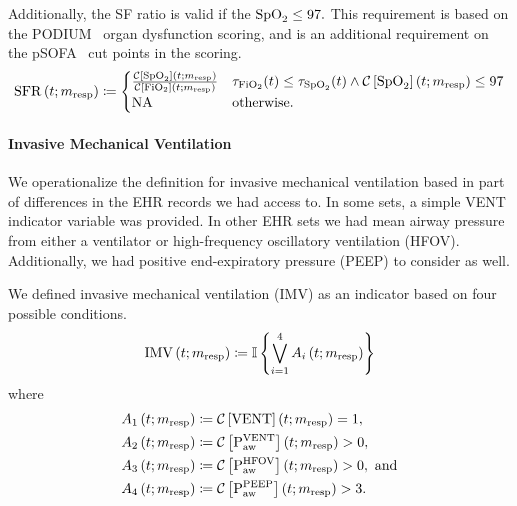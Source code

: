 \documentclass[letterpaper,10pt]{article}
\begin{document}
Additionally, the SF ratio is valid if the $\mathrm{SpO}_{2} \leq 97.$ This requirement is
based on the PODIUM~\citep{Bembea2022,Yehya2022} organ
dysfunction scoring, and is an additional requirement on the
pSOFA~\citep{Matics2017} cut points in
the scoring.
\begin{equation}
  \label{eq:sfr}
  \mathrm{SFR}\left(t; m_{\mathrm{resp}}\right) \coloneqq
  \begin{cases}
    \frac{\mathcal{C}\left[\mathrm{SpO}_{2}\right]\left(t;m_{\mathrm{resp}}\right)}{\mathcal{C}\left[\mathrm{FiO}_{2}\right]\left(t;m_{\mathrm{resp}}\right)} &
    \tau_{\mathrm{FiO}_{2}}(t) \leq \tau_{\mathrm{SpO}_{2}}(t) \wedge
    \mathcal{C}\left[\mathrm{SpO}_{2}\right]\left(t;m_{\mathrm{resp}}\right) \leq 97 \\
    \mathrm{NA} & \text{otherwise.}
  \end{cases}
\end{equation}

\paragraph{Invasive Mechanical Ventilation}

We operationalize the definition for invasive mechanical ventilation
based in part of differences in the EHR records we had access to. In
some sets, a simple VENT indicator variable was provided. In other EHR
sets we had mean airway pressure from either a ventilator or
high-frequency oscillatory ventilation (HFOV). Additionally, we had
positive end-expiratory pressure (PEEP) to consider as well.

We defined invasive mechanical ventilation (IMV) as an indicator
based on four possible conditions.
\begin{equation}
  \label{eq:imv}
  \mathrm{IMV}\left(t; m_{\mathrm{resp}}\right) \coloneqq \mathbb{I}\left\{\bigvee_{i=1}^{4} A_{i}\left(t; m_{\mathrm{resp}}\right)\right\}
\end{equation}
where
\begin{equation}
  \label{eq:imv-conditions}
  \begin{aligned}
    A_{1}\left(t; m_{\mathrm{resp}}\right) &\coloneqq \mathcal{C}\left[\mathrm{VENT}\right]\left(t;m_{\mathrm{resp}}\right) = 1, \\
    A_{2}\left(t; m_{\mathrm{resp}}\right) &\coloneqq \mathcal{C}\left[\mathrm{P}_{\mathrm{aw}}^{\mathrm{VENT}}\right]\left(t;m_{\mathrm{resp}}\right) > 0, \\
    A_{3}\left(t; m_{\mathrm{resp}}\right) &\coloneqq \mathcal{C}\left[\mathrm{P}_{\mathrm{aw}}^{\mathrm{HFOV}}\right]\left(t;m_{\mathrm{resp}}\right) > 0, \text{ and} \\
    A_{4}\left(t; m_{\mathrm{resp}}\right) &\coloneqq \mathcal{C}\left[\mathrm{P}_{\mathrm{aw}}^{\mathrm{PEEP}}\right]\left(t;m_{\mathrm{resp}}\right) > 3.
  \end{aligned}
\end{equation}
\end{document}
